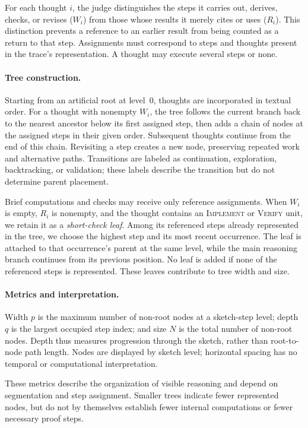 For each thought $i$, the judge distinguishes the steps it carries out,
derives, checks, or revises ($W_i$) from those whose results it merely cites
or uses ($R_i$). This distinction prevents a reference to an earlier result
from being counted as a return to that step. Assignments must correspond to
steps and thoughts present in the trace's representation. A thought may
execute several steps or none.

\paragraph{Tree construction.}
Starting from an artificial root at level~0, thoughts are incorporated in
textual order. For a thought with nonempty $W_i$, the tree follows the
current branch back to the nearest ancestor below its first assigned step,
then adds a chain of nodes at the assigned steps in their given order.
Subsequent thoughts continue from the end of this chain. Revisiting a step
creates a new node, preserving repeated work and alternative paths.
Transitions are labeled as continuation, exploration, backtracking, or
validation; these labels describe the transition but do not determine
parent placement.

Brief computations and checks may receive only reference assignments.
When $W_i$ is empty, $R_i$ is nonempty, and the thought contains an
\textsc{Implement} or \textsc{Verify} unit, we retain it as a
\emph{short-check leaf}. Among its referenced steps already represented in
the tree, we choose the highest step and its most recent occurrence. The
leaf is attached to that occurrence's parent at the same level, while the
main reasoning branch continues from its previous position. No leaf is
added if none of the referenced steps is represented. These leaves
contribute to tree width and size.

\paragraph{Metrics and interpretation.}
Width $p$ is the maximum number of non-root nodes at a sketch-step level;
depth $q$ is the largest occupied step index; and size $N$ is the total
number of non-root nodes. Depth thus measures progression through the
sketch, rather than root-to-node path length. Nodes are displayed by sketch
level; horizontal spacing has no temporal or computational interpretation.

These metrics describe the organization of visible reasoning and depend on
segmentation and step assignment. Smaller trees indicate fewer represented
nodes, but do not by themselves establish fewer internal computations or
fewer necessary proof steps.

